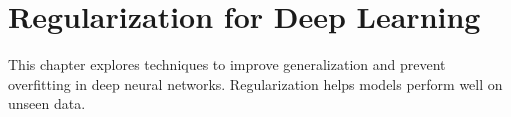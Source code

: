 
\chapter{Regularization for Deep Learning}
\label{chap:regularization}

This chapter explores techniques to improve generalization and prevent overfitting in deep neural networks. Regularization helps models perform well on unseen data.








